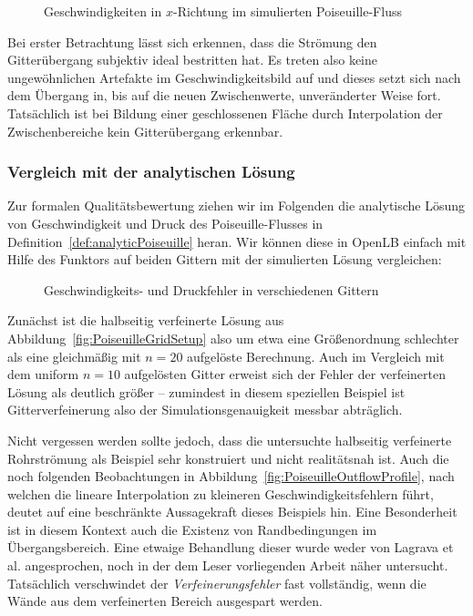 \begin{figure}[h]
\begin{adjustbox}{center}

\end{adjustbox}
\caption{Geschwindigkeiten in \(x\)-Richtung im simulierten Poiseuille-Fluss}
\label{fig:PoiseuilleVelocityGrid}
\end{figure}

Bei erster Betrachtung lässt sich erkennen, dass die Strömung den Gitterübergang subjektiv ideal bestritten hat. Es treten also keine ungewöhnlichen Artefakte im Geschwindigkeitsbild auf und dieses setzt sich nach dem Übergang in, bis auf die neuen Zwischenwerte, unveränderter Weise fort. Tatsächlich ist bei Bildung einer geschlossenen Fläche durch Interpolation der Zwischenbereiche kein Gitterübergang erkennbar.

\newpage
\subsubsection{Vergleich mit der analytischen Lösung}

Zur formalen Qualitätsbewertung ziehen wir im Folgenden die analytische Lösung von Geschwindigkeit und Druck des Poiseuille-Flusses in Definition~\ref{def:analyticPoiseuille} heran. Wir können diese in \mbox{OpenLB} einfach mit Hilfe des  Funktors auf beiden Gittern mit der simulierten Lösung vergleichen:

\begin{figure}[h]
\centering

\caption{Geschwindigkeits- und Druckfehler in verschiedenen Gittern}
\label{fig:PoiseuilleErrorNorm}
\end{figure}

Zunächst ist die halbseitig verfeinerte Lösung aus Abbildung~\ref{fig:PoiseuilleGridSetup} also um etwa eine Größenordnung schlechter als eine gleichmäßig mit \(n=20\) aufgelöste Berechnung. Auch im Vergleich mit dem uniform \(n=10\) aufgelösten Gitter erweist sich der Fehler der verfeinerten Lösung als deutlich größer -- zumindest in diesem speziellen Beispiel ist Gitterverfeinerung also der Simulationsgenauigkeit messbar abträglich.

Nicht vergessen werden sollte jedoch, dass die untersuchte halbseitig verfeinerte Rohrströmung als Beispiel sehr konstruiert und nicht realitätsnah ist. Auch die noch folgenden Beobachtungen in Abbildung~\ref{fig:PoiseuilleOutflowProfile}, nach welchen die lineare Interpolation zu kleineren Geschwindigkeitsfehlern führt, deutet auf eine beschränkte Aussagekraft dieses Beispiels hin.
Eine Besonderheit ist in diesem Kontext auch die Existenz von Randbedingungen im Übergangsbereich. Eine etwaige Behandlung dieser wurde weder von Lagrava et al. angesprochen, noch in der dem Leser vorliegenden Arbeit näher untersucht. Tatsächlich verschwindet der \emph{Verfeinerungsfehler} fast vollständig, wenn die Wände aus dem verfeinerten Bereich ausgespart werden.

